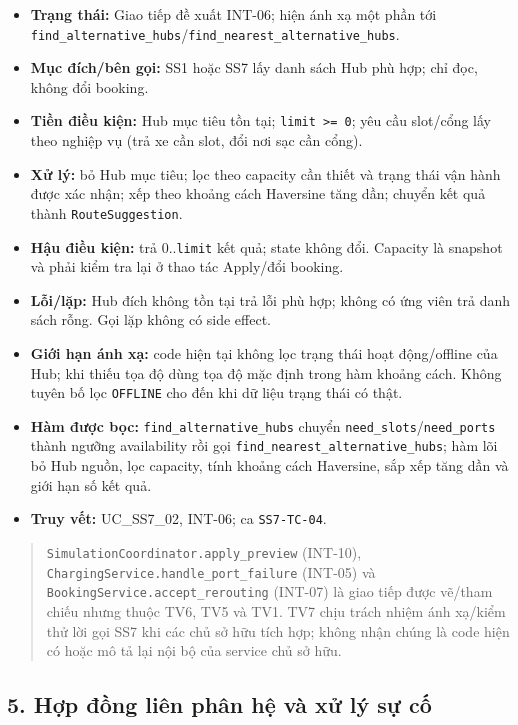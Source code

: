 \documentclass[11pt,a4paper]{article}
\providecommand{\tightlist}{%
  \setlength{\itemsep}{0pt}\setlength{\parskip}{0pt}}
\begin{document}
\begin{itemize}
\tightlist
\item
  \textbf{Trạng thái:} Giao tiếp đề xuất INT-06; hiện ánh xạ một phần
  tới
  \texttt{find\_alternative\_hubs}/\texttt{find\_nearest\_alternative\_hubs}.
\item
  \textbf{Mục đích/bên gọi:} SS1 hoặc SS7 lấy danh sách Hub phù hợp; chỉ
  đọc, không đổi booking.
\item
  \textbf{Tiền điều kiện:} Hub mục tiêu tồn tại;
  \texttt{limit\ \textgreater{}=\ 0}; yêu cầu slot/cổng lấy theo nghiệp
  vụ (trả xe cần slot, đổi nơi sạc cần cổng).
\item
  \textbf{Xử lý:} bỏ Hub mục tiêu; lọc theo capacity cần thiết và trạng
  thái vận hành được xác nhận; xếp theo khoảng cách Haversine tăng dần;
  chuyển kết quả thành \texttt{RouteSuggestion}.
\item
  \textbf{Hậu điều kiện:} trả 0..\texttt{limit} kết quả; state không
  đổi. Capacity là snapshot và phải kiểm tra lại ở thao tác Apply/đổi
  booking.
\item
  \textbf{Lỗi/lặp:} Hub đích không tồn tại trả lỗi phù hợp; không có ứng
  viên trả danh sách rỗng. Gọi lặp không có side effect.
\item
  \textbf{Giới hạn ánh xạ:} code hiện tại không lọc trạng thái hoạt
  động/offline của Hub; khi thiếu tọa độ dùng tọa độ mặc định trong hàm
  khoảng cách. Không tuyên bố lọc \texttt{OFFLINE} cho đến khi dữ liệu
  trạng thái có thật.
\item
  \textbf{Hàm được bọc:} \texttt{find\_alternative\_hubs} chuyển
  \texttt{need\_slots}/\texttt{need\_ports} thành ngưỡng availability
  rồi gọi \texttt{find\_nearest\_alternative\_hubs}; hàm lõi bỏ Hub
  nguồn, lọc capacity, tính khoảng cách Haversine, sắp xếp tăng dần và
  giới hạn số kết quả.
\item
  \textbf{Truy vết:} UC\_SS7\_02, INT-06; ca \texttt{SS7-TC-04}.
\end{itemize}

\begin{quote}
\texttt{SimulationCoordinator.apply\_preview} (INT-10),
\texttt{ChargingService.handle\_port\_failure} (INT-05) và
\texttt{BookingService.accept\_rerouting} (INT-07) là giao tiếp được
vẽ/tham chiếu nhưng thuộc TV6, TV5 và TV1. TV7 chịu trách nhiệm ánh
xạ/kiểm thử lời gọi SS7 khi các chủ sở hữu tích hợp; không nhận chúng là
code hiện có hoặc mô tả lại nội bộ của service chủ sở hữu.
\end{quote}

\hypertarget{hux1ee3p-ux111ux1ed3ng-liuxean-phuxe2n-hux1ec7-vuxe0-xux1eed-luxfd-sux1ef1-cux1ed1}{%
\subsection{5. Hợp đồng liên phân hệ và xử lý sự
cố}\label{hux1ee3p-ux111ux1ed3ng-liuxean-phuxe2n-hux1ec7-vuxe0-xux1eed-luxfd-sux1ef1-cux1ed1}}
\end{document}

